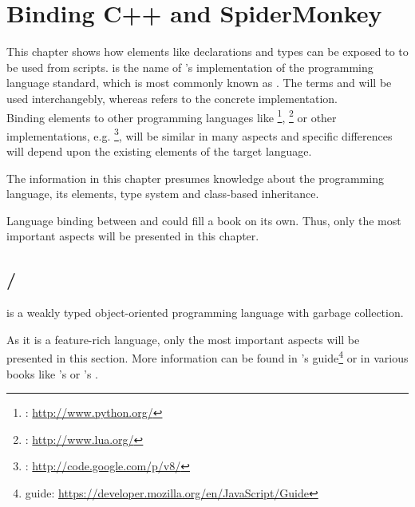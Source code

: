 \chapter{Binding C++ and SpiderMonkey}
\label{chap:LanguageBindingCPPJS}

This chapter shows how  elements like declarations and types can be exposed to  to be used from scripts.  is the name of 's implementation of the  programming language standard, which is most commonly known as . The terms  and  will be used interchangebly, whereas  refers to the concrete  implementation.\\
Binding  elements to other programming languages like \footnote{: \url{http://www.python.org/}}, \footnote{: \url{http://www.lua.org/}} or other  implementations, e.g. \footnote{: \url{http://code.google.com/p/v8/}}, will be similar in many aspects and specific differences will depend upon the existing elements of the target language.

The information in this chapter presumes knowledge about the  programming language, its elements, type system and class-based inheritance.

Language binding between  and  could fill a book on its own. Thus, only the most important aspects will be presented in this chapter.

\section{/}
\label{sec:JavaScript}

 is a weakly typed object-oriented programming language with garbage collection. 

As it is a feature-rich language, only the most important aspects will be presented in this section. More information can be found in 's  guide\footnote{ guide: \url{https://developer.mozilla.org/en/JavaScript/Guide}} or in various books like 's  or 's .

